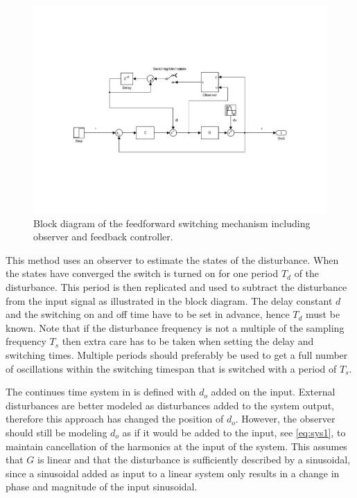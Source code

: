 \begin{figure}[h]
  \centering %
  \includegraphics[width=1\textwidth, trim=6cm 5.5cm 5.2cm 5.5cm, clip=true]{fig/matlab/ffrep}
  \caption{\label{fig:ffrep}Block diagram of the feedforward switching mechanism including observer and feedback controller.}
\end{figure}

This method uses an observer to estimate the states of the disturbance. When the states have converged the switch is turned on for one period $T_d$ of the disturbance. This period is then replicated and used to subtract the disturbance from the input signal as illustrated in the block diagram. The delay constant $d$ and the switching on and off time have to be set in advance, hence $T_d$ must be known. Note that if the disturbance frequency is not a multiple of the sampling frequency $T_s$ then extra care has to be taken when setting the delay and switching times. Multiple periods should preferably be used to get a full number of oscillations within the switching timespan that is switched with a period of $T_s$.

The continues time system in \citep{fujimoto2004repetitive} is defined with $d_o$ added on the input. External disturbances are better modeled as disturbances added to the system output, therefore this approach has changed the position of $d_o$. However, the observer should still be modeling $d_o$ as if it would be added to the input, see \eqref{eq:sys1}, to maintain cancellation of the harmonics at the input of the system. This assumes that $G$ is linear and that the disturbance is sufficiently described by a sinusoidal, since a sinusoidal added as input to a linear system only results in a change in phase and magnitude of the input sinusoidal.

